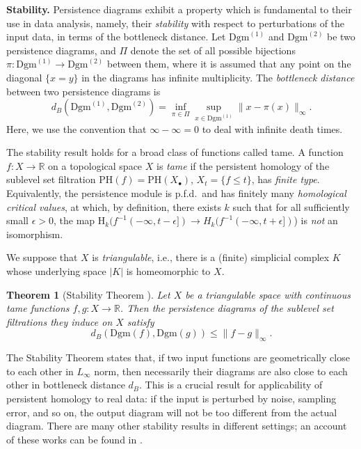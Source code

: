 \documentclass[11pt]{article}
\newcommand{\R}{\mathbb{R}}
\newcommand{\Dgm}{\mathrm{Dgm}}
\newcommand{\PH}{\mathrm{PH}}
\newcommand{\eps}{\epsilon}
\newcommand{\Xb}{X_\bullet}
\renewcommand{\H}{\mathrm{H}}
\theoremstyle{plain}
\newtheorem{thm}{Theorem}
\theoremstyle{definition}
\theoremstyle{remark}
\begin{document}
	\textbf{Stability.}
	Persistence diagrams exhibit a property which is fundamental to their use in data analysis, namely, their \textit{stability} with respect to perturbations of the input data, in terms of the bottleneck distance.
	Let $\Dgm^{(1)}$ and $\Dgm^{(2)}$ be two persistence diagrams, and $\Pi$ denote the set of all possible bijections $\pi : \Dgm^{(1)} \to \Dgm^{(2)}$ between them, where it is assumed that any point on the diagonal $\{x = y\}$ in the diagrams has infinite multiplicity. 
	The \emph{bottleneck distance} between two persistence diagrams is
	\[d_B(\Dgm^{(1)}, \Dgm^{(2)}) = \inf \limits_{\pi \in \Pi} \sup \limits_{x \in \Dgm^{(1)}} \|x - \pi(x) \|_\infty.\]
	Here, we use the convention that $\infty - \infty = 0$ to deal with infinite death times.
	
	The stability result holds for a broad class of functions called tame.
	A function $f : X \to \R$ on a topological space $X$ is \emph{tame} if the persistent homology of the sublevel set filtration $\PH(f) = \PH(\Xb)$, $X_t = \{f \leq t\}$, has \textit{finite type}. 
	Equivalently, the persistence module is p.f.d.~and has finitely many \emph{homological critical values}, at which, by definition, there exists $k$ such that for all sufficiently small $\eps > 0$, the map $\H_k(f^{-1}(-\infty,t-\eps]) \to H_k(f^{-1}(-\infty,t+\eps])$) is \textit{not} an isomorphism.
	
	We suppose that $X$ is \emph{triangulable}, i.e., there is a (finite) simplicial complex $K$ whose underlying space $|K|$ is homeomorphic to $X$.
	\begin{thm}[Stability Theorem \citep{cohen-steiner_stability_2007}]
		\label{thm:stability_thm}
		Let $X$ be a triangulable space with continuous tame functions $f, g : X \to \R$.
		Then the persistence diagrams of the sublevel set filtrations they induce on $X$ satisfy
		\[d_B(\Dgm(f), \Dgm(g)) \leq \|f - g\|_\infty.\]
	\end{thm}
	The Stability Theorem states that, if two input functions are geometrically close to each other in $L_\infty$ norm, then necessarily their diagrams are also close to each other in bottleneck distance $d_B$.  
	This is a crucial result for applicability of persistent homology to real data: if the input is perturbed by noise, sampling error, and so on, the output diagram will not be too different from the actual diagram.
	There are many other stability results in different settings; an account of these works can be found in \cite[Section 2.3]{cao_approximating_2022}.
	
\end{document}
